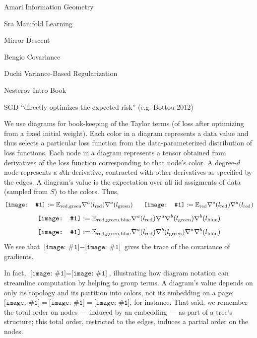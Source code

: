 \documentclass[12pt]{article}
\newcommand{\dia}[1]{\texttt{[image: \#1]}}
\begin{document}
            Amari Information Geometry

            Sra Manifold Learning

            Mirror Descent

            Bengio Covariance

            Duchi Variance-Based Regularization

            Nesterov Intro Book

            SGD ``directly optimizes the expected risk'' (e.g. Bottou 2012)



            We use diagrams for book-keeping of the Taylor terms (of loss after optimizing from a fixed initial weight). 
            Each color in a diagram represents a data value and thus selects a particular loss function from the
            data-parameterized distribution of loss functions.  Each node in a diagram represents a tensor obtained from
            derivatives of the loss function corresponding to that node's color.  A degree-$d$ node represents a
            $d$th-derivative, contracted with other derivatives as specified by the edges.  A diagram's value is the
            expectation over all iid assigments of data (sampled from $S$) to the colors.  Thus,
            $$
                \dia{rg} := \expec_{\text{red},\text{green}} \nabla^a(l_{\text{red}}) \nabla^a(l_{\text{green}})
                ~~~~~
                \dia{rr} := \expec_{\text{red}} \nabla^a(l_{\text{red}}) \nabla^a(l_{\text{red}})
            $$
            $$
                \dia{rgb} := \expec_{\text{red},\text{green},\text{blue}} \nabla^a(l_{\text{red}}) \nabla^a \nabla^b(l_{\text{green}}) \nabla^b(l_{\text{blue}})
            $$
            $$
                \dia{sgd-2b} := \expec_{\text{red},\text{green},\text{blue}} \nabla^a(l_{\text{red}}) \nabla^b(l_{\text{green}}) \nabla^a \nabla^b(l_{\text{blue}})
            $$
            We see that $\dia{rr}-\dia{rg}$ gives the trace of the covariance of gradients.

            In fact, $\dia{sgd-2a} = \dia{sgd-2b}$, illustrating how diagram notation can streamline computation by
            helping to group terms.  A diagram's value depends on only its topology and its partition into colors, not
            its embedding on a page; $\dia{rggb-a} = \dia{rggb-b} = \dia{new-rgbg}$, for instance.  That said, we
            remember the total order on nodes --- induced by an embedding --- as part of a tree's structure; this
            total order, restricted to the edges, induces a partial order on the nodes. 
\end{document}
